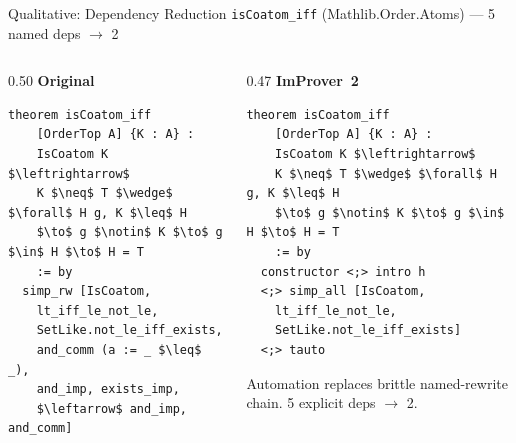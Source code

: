 \documentclass{beamer}
\begin{document}
\begin{frame}[fragile]{Qualitative: Dependency Reduction}
\vspace{0.2em}
{\small \texttt{isCoatom\_iff} (Mathlib.Order.Atoms) --- 5 named deps $\to$ 2}
\begin{columns}[T]
\begin{column}{0.50\textwidth}
\textbf{Original}
\begin{lstlisting}[basicstyle=\scriptsize\ttfamily]
theorem isCoatom_iff
    [OrderTop A] {K : A} :
    IsCoatom K $\leftrightarrow$
    K $\neq$ T $\wedge$ $\forall$ H g, K $\leq$ H
    $\to$ g $\notin$ K $\to$ g $\in$ H $\to$ H = T
    := by
  simp_rw [IsCoatom,
    lt_iff_le_not_le,
    SetLike.not_le_iff_exists,
    and_comm (a := _ $\leq$ _),
    and_imp, exists_imp,
    $\leftarrow$ and_imp, and_comm]
\end{lstlisting}
\end{column}
\begin{column}{0.47\textwidth}
\textbf{ImProver~2}
\begin{lstlisting}[basicstyle=\scriptsize\ttfamily]
theorem isCoatom_iff
    [OrderTop A] {K : A} :
    IsCoatom K $\leftrightarrow$
    K $\neq$ T $\wedge$ $\forall$ H g, K $\leq$ H
    $\to$ g $\notin$ K $\to$ g $\in$ H $\to$ H = T
    := by
  constructor <;> intro h
  <;> simp_all [IsCoatom,
    lt_iff_le_not_le,
    SetLike.not_le_iff_exists]
  <;> tauto
\end{lstlisting}
\vspace{0.3em}
\small Automation replaces brittle named-rewrite chain. 5 explicit deps $\to$ 2.
\end{column}
\end{columns}
\end{frame}
\end{document}
